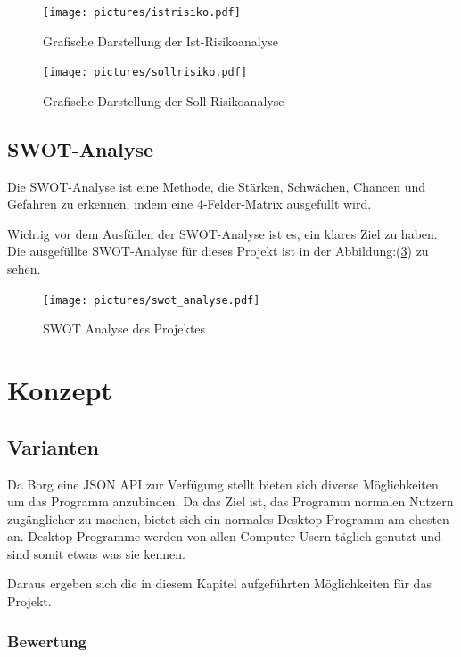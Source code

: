 \begin{figure}[H]
\centering
\texttt{[image: pictures/istrisiko.pdf]}
\caption{\label{fig:org8251252}
Grafische Darstellung der Ist-Risikoanalyse}
\end{figure}

\begin{figure}[H]
\centering
\texttt{[image: pictures/sollrisiko.pdf]}
\caption{\label{fig:org38b227a}
Grafische Darstellung der Soll-Risikoanalyse}
\end{figure}

\newpage
\subsection{SWOT-Analyse}
\label{sec:org78e590a}

Die SWOT-Analyse ist eine Methode, die Stärken, Schwächen, Chancen und
Gefahren zu erkennen, indem eine 4-Felder-Matrix ausgefüllt wird.

Wichtig vor dem Ausfüllen der SWOT-Analyse ist es, ein klares Ziel zu
haben. Die ausgefüllte SWOT-Analyse für dieses Projekt ist in der
Abbildung:(\ref{fig:org8d92421}) zu sehen.

\begin{figure}[htbp]
\centering
\texttt{[image: pictures/swot\_analyse.pdf]}
\caption{\label{fig:org8d92421}
SWOT Analyse des Projektes}
\end{figure}

\section{Konzept}
\label{sec:org34777b1}

\subsection{Varianten}
\label{sec:orgee7897b}

Da Borg eine JSON API zur Verfügung stellt bieten sich diverse Möglichkeiten um
das Programm anzubinden. Da das Ziel ist, das Programm normalen Nutzern
zugänglicher zu machen, bietet sich ein normales Desktop Programm am ehesten
an. Desktop Programme werden von allen Computer Usern täglich genutzt und sind
somit etwas was sie kennen.

Daraus ergeben sich die in diesem Kapitel aufgeführten Möglichkeiten für das
Projekt.

\subsubsection{Bewertung}
\label{sec:orgd04a5af}

